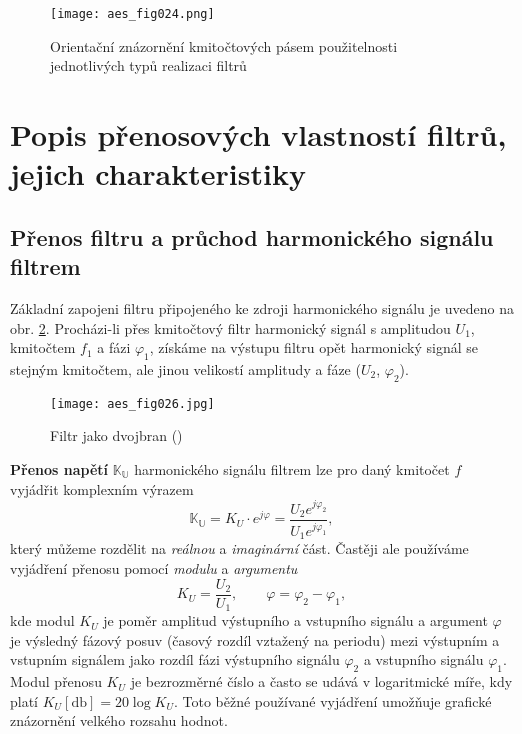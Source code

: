       \begin{figure}[ht!]
        \centering
        \texttt{[image: aes\_fig024.png]}
        \caption[Orientační znázornění kmitočtových pásem použitelnosti jednotlivých typů
                  realizaci filtrů]{Orientační znázornění kmitočtových pásem použitelnosti
                  jednotlivých typů realizaci filtrů}
        \label{aes:fig024}    
      \end{figure} 

  \section{Popis přenosových vlastností filtrů, jejich charakteristiky}
    \subsection{Přenos filtru a průchod harmonického signálu filtrem}
      Základní zapojeni filtru připojeného ke zdroji harmonického signálu je uvedeno na obr.
      \ref{aes:fig026}. Procházi-li přes kmitočtový filtr harmonický signál s amplitudou \(U_1\),
      kmitočtem \(f_1\) a fázi \(\varphi_1\), získáme na výstupu filtru opět harmonický signál se
      stejným kmitočtem, ale jinou velikostí amplitudy a fáze (\(U_2\), \(\varphi_2\)).
  
      \begin{figure}[ht!]
        \centering
        \texttt{[image: aes\_fig026.jpg]}
        \caption[Filtr jako dvojbran]{Filtr jako dvojbran (\cite[s.~25]{HajekSedlacek2002})}
        \label{aes:fig026}    
      \end{figure}
      
      \textbf{Přenos napětí} \(\mathbb{K_U}\) harmonického signálu filtrem lze pro daný kmitočet
      \(f\) vyjádřit komplexním výrazem
      \begin{equation*}
        \mathbb{K_U} = K_U\cdot e^{j\varphi} = \frac{U_2e^{j\varphi_2}}{U_1e^{j\varphi_1}},
      \end{equation*}
      který můžeme rozdělit na \emph{reálnou} a \emph{imaginární} část. Častěji ale používáme
      vyjádření přenosu pomocí \emph{modulu} a \emph{argumentu}
      \begin{equation*}
        K_U = \frac{U_2}{U_1}, \qquad \varphi = \varphi_2 - \varphi_1, 
      \end{equation*}
      kde modul \(K_U\) je poměr amplitud výstupního a vstupního signálu a argument \(\varphi\) je
      výsledný fázový posuv (časový rozdíl vztažený na periodu) mezi výstupním a vstupním signálem
      jako rozdíl fázi výstupního signálu \(\varphi_2\) a vstupního signálu \(\varphi_1\). Modul
      přenosu \(K_U\) je bezrozměrné číslo a často se udává v logaritmické míře, kdy platí \(K_U
      [\si{\decibel}] = 20 \log{K_U}\). Toto běžné používané vyjádření umožňuje grafické
      znázornění velkého rozsahu hodnot.

